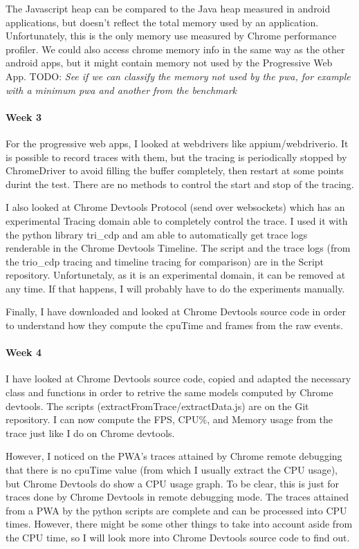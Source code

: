 \documentclass{kththesis}
\begin{document}
The Javascript heap can be compared to the Java heap measured in android applications, but doesn't reflect the total memory used by an application. Unfortunately, this is the only memory use measured by Chrome performance profiler. We could also access chrome memory info in the same way as the other android apps, but it might contain memory not used by the Progressive Web App.
\newline
TODO: 
\textit{See if we can classify the memory not used by the pwa, for example with a minimum pwa and another from the benchmark}
\paragraph{Week 3}
For the progressive web apps, I looked at webdrivers like appium/webdriverio. It is possible to record traces with them, but the tracing is periodically stopped by ChromeDriver to avoid filling the buffer completely, then restart at some points durint the test. There are no methods to control the start and stop of the tracing.  

I also looked at Chrome Devtools Protocol (send over websockets) which has an experimental Tracing domain able to completely control the trace. I used it with the python library tri\_cdp and am able to automatically get trace logs renderable in the Chrome Devtools Timeline. The script and the trace logs (from the trio\_cdp tracing and timeline tracing for comparison) are in the Script repository. 
Unfortunetaly, as it is an experimental domain, it can be removed at any time. If that happens, I will probably have to do the experiments manually.

Finally, I have downloaded and looked at Chrome Devtools source code in order to understand how they compute the cpuTime and frames from the raw events.
\paragraph{Week 4}
I have looked at Chrome Devtools source code, copied and adapted the necessary class and functions in order to retrive the same models computed by Chrome devtools. The scripts (extractFromTrace/extractData.js) are on the Git repository. I can now compute the FPS, CPU\%, and Memory usage from the trace just like I do on Chrome devtools.

However, I noticed on the PWA's traces attained by Chrome remote debugging that there is no cpuTime value (from which I usually extract the CPU usage), but Chrome Devtools do show a CPU usage graph. To be clear, this is just for traces done by Chrome Devtools in remote debugging mode. The traces attained from a PWA by the python scripts are complete and can be processed into CPU times. However, there might be some other things to take into account aside from the CPU time, so I will look more into Chrome Devtools source code to find out.
\end{document}
